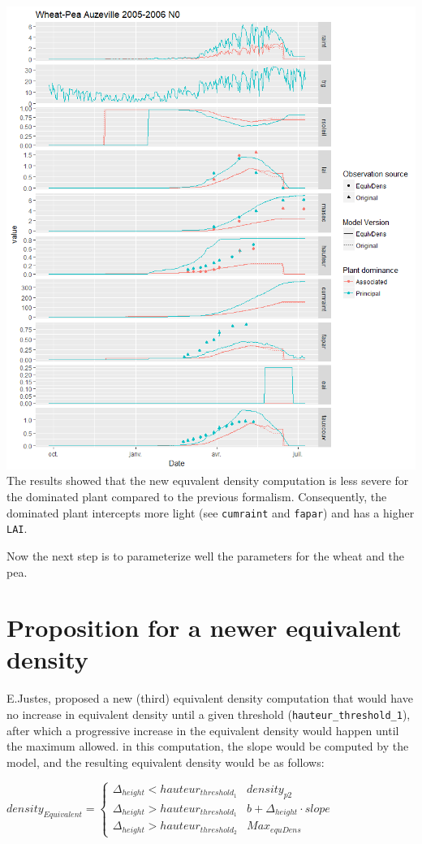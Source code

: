 \documentclass[]{book}
\theoremstyle{definition}
\theoremstyle{definition}
\theoremstyle{definition}
\theoremstyle{remark}
\begin{document}
\includegraphics{img/Equ-dens-computation.png} The results showed that
the new equvalent density computation is less severe for the dominated
plant compared to the previous formalism. Consequently, the dominated
plant intercepts more light (see \texttt{cumraint} and \texttt{fapar})
and has a higher \texttt{LAI}.

Now the next step is to parameterize well the parameters for the wheat
and the pea.

\section{Proposition for a newer equivalent
density}\label{proposition-for-a-newer-equivalent-density}

E.Justes, proposed a new (third) equivalent density computation that
would have no increase in equivalent density until a given threshold
(\texttt{hauteur\_threshold\_1}), after which a progressive increase in
the equivalent density would happen until the maximum allowed. in this
computation, the slope would be computed by the model, and the resulting
equivalent density would be as follows:

\(density_{Equivalent} =\begin{cases}\Delta_{height} < hauteur_{threshold_1} & density_{p2} \\ \Delta_{height} > hauteur_{threshold_1} & b + \Delta_{height}\cdot slope \\ \Delta_{height} > hauteur_{threshold_2} & Max_{equDens} \end{cases}\)
\end{document}
